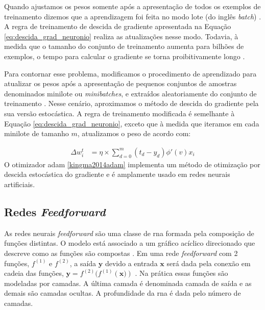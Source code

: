 Quando ajustamos os pesos somente após a apresentação de todos os exemplos de treinamento dizemos que a aprendizagem foi feita no modo lote (do inglês \textit{batch}) \cite{Haykin}.  A regra de treinamento de descida de gradiente apresentada na Equação \ref{eq:descida_grad_neuronio} realiza as atualizações nesse modo. Todavia, à medida que o tamanho do conjunto de treinamento aumenta para bilhões de exemplos, o tempo para calcular o gradiente se torna proibitivamente longo \cite{Goodfellow2016}.

Para contornar esse problema, modificamos o procedimento de aprendizado para atualizar os pesos após a apresentação de pequenos conjuntos de amostras denominados minilote ou \textit{minibatches}, e extraídos aleatoriamente do conjunto de treinamento \cite{Goodfellow2016}. Nesse cenário, aproximamos o método de descida do gradiente pela sua versão estocástica. 
A regra de treinamento modificada é semelhante à Equação \ref{eq:descida_grad_neuronio}, exceto que à medida que iteramos em cada minilote de tamanho $m$, atualizamos o peso de acordo com:

\begin{equation}
\label{eq:descida_grad__estocastica_neuronio}
\begin{aligned}
\Delta{w}^{t}_{i} &=  \eta \times \sum_{d=0}^{m} (t_{d} - y_{d})\phi'(v)x_{i}
\end{aligned}
\end{equation}
O otimizador \gls{adam} \ref{kingma2014adam} implementa um método de otimização por descida estocástica do gradiente e é amplamente usado em redes neurais artificiais.  

\subsection{Redes \textit{Feedforward}}

As redes neurais \textit{feedforward} são uma classe de \acrshort{rna} formada pela composição de funções distintas.  O modelo está associado a um gráfico acíclico direcionado que descreve como as funções são compostas \cite{Goodfellow2016}. Em uma rede \textit{feedforward} com 2 funções,  $f^{(1)}$ e $f^{(2)}$, a saída $\textbf{y}$ devido a entrada $\textbf{x}$  será dada pela conexão em cadeia das funções, $ \textbf{y} = f^{(2)}(f^{(1)}(\textbf{x)})$ \cite{Goodfellow2016}. Na prática essas funções são modeladas por camadas.
A última camada é denominada camada de saída e as demais são camadas ocultas. A profundidade da \acrshort{rna} é dada pelo número de camadas.  

